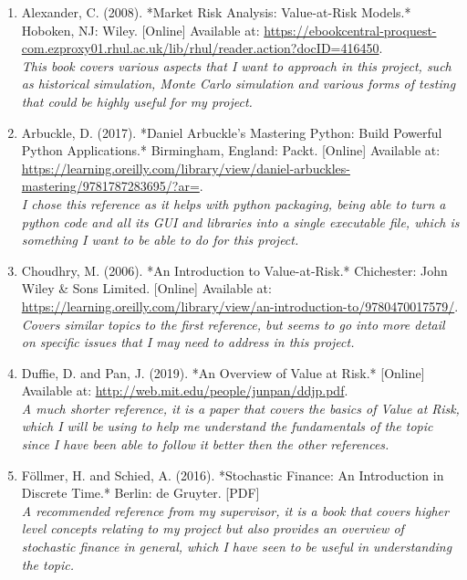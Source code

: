 \documentclass{article}
\begin{document}
\begin{small}
\begin{enumerate}
  \item \label{ref1} Alexander, C. (2008). *Market Risk Analysis: Value-at-Risk Models.* Hoboken, NJ: Wiley. [Online] Available at: \url{https://ebookcentral-proquest-com.ezproxy01.rhul.ac.uk/lib/rhul/reader.action?docID=416450}.
  \\\textit{This book covers various aspects that I want to approach in this project, such as historical simulation, Monte Carlo simulation and various forms of testing that could be highly useful for my project.}
  
  \item \label{ref2} Arbuckle, D. (2017). *Daniel Arbuckle’s Mastering Python: Build Powerful Python Applications.* Birmingham, England: Packt. [Online] Available at: \url{https://learning.oreilly.com/library/view/daniel-arbuckles-mastering/9781787283695/?ar=}.
  \\\textit{I chose this reference as it helps with python packaging, being able to turn a python code and all its GUI and libraries into a single executable file, which is something I want to be able to do for this project.}

  \item \label{ref3} Choudhry, M. (2006). *An Introduction to Value-at-Risk.* Chichester: John Wiley \& Sons Limited. [Online] Available at: \\ \url{https://learning.oreilly.com/library/view/an-introduction-to/9780470017579/}.
  \\\textit{Covers similar topics to the first reference, but seems to go into more detail on specific issues that I may need to address in this project.}
  
  \item \label{ref4} Duffie, D. and Pan, J. (2019). *An Overview of Value at Risk.* [Online] Available at: \url{http://web.mit.edu/people/junpan/ddjp.pdf}.
  \\\textit{A much shorter reference, it is a paper that covers the basics of Value at Risk, which I will be using to help me understand the fundamentals of the topic since I have been able to follow it better then the other references.}
  
  \item \label{ref5} Föllmer, H. and Schied, A. (2016). *Stochastic Finance: An Introduction in Discrete Time.* Berlin: de Gruyter. [PDF]
  \\\textit{A recommended reference from my supervisor, it is a book that covers higher level concepts relating to my project but also provides an overview of stochastic finance in general, which I have seen to be useful in understanding the topic.}
  

\end{enumerate}
\end{small}
\end{document}
